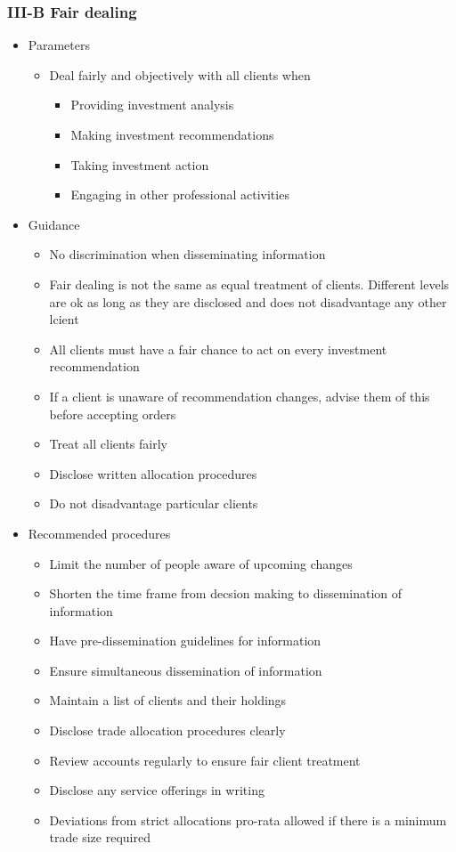 \documentclass[../notes_compiled.tex]{subfiles}
\begin{document}
\subsubsection{III-B Fair dealing}
\begin{itemize}
\item Parameters
\begin{itemize}
\item Deal fairly and objectively with all clients when
\begin{itemize}
\item Providing investment analysis
\item Making investment recommendations
\item Taking investment action
\item Engaging in other professional activities
\end{itemize}
\end{itemize}
\item Guidance
\begin{itemize}
\item No discrimination when disseminating information
\item Fair dealing is not the same as equal treatment of clients. Different levels are ok as long as they are disclosed and does not disadvantage any other lcient
\item All clients must have a fair chance to act on every investment recommendation
\item If a client is unaware of recommendation changes, advise them of this before accepting orders
\item Treat all clients fairly
\item Disclose written allocation procedures
\item Do not disadvantage particular clients
\end{itemize}
\item Recommended procedures
\begin{itemize}
\item Limit the number of people aware of upcoming changes
\item Shorten the time frame from decsion making to dissemination of information
\item Have pre-dissemination guidelines for information
\item Ensure simultaneous dissemination of information
\item Maintain a list of clients and their holdings
\item Disclose trade allocation procedures clearly
\item Review accounts regularly to ensure fair client treatment
\item Disclose any service offerings in writing
\item Deviations from strict allocations pro-rata allowed if there is a minimum trade size required
\end{itemize}
\end{itemize}
\end{document}

